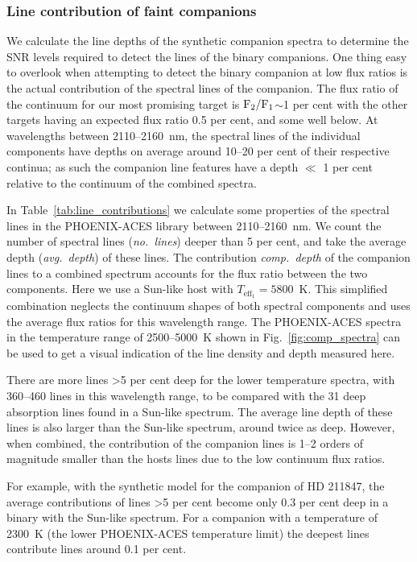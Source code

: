 \documentclass[fleqn,usenatbib]{mnras}
\newcommand*\bl{\color{blue}}
\begin{document}
    \subsubsection{Line contribution of faint companions}
    \label{subsubsec:line_contributions}
    We calculate the line depths of the synthetic companion spectra to determine the SNR levels required to detect the lines of the binary companions.
    One thing easy to overlook when attempting to detect the binary companion at low flux ratios is the actual contribution of the spectral lines of the companion.
    The flux ratio of the continuum for our most promising target is \(\rm F_2/F_1\)\(\sim\)1 per cent with the other targets having an expected flux ratio 0.5 per cent, and some well below. {\bl At wavelengths between 2110--2160~nm, the spectral lines of the individual components have depths on average around 10--20 per cent of their respective continua; as such the companion line features have a depth \(\ll\) 1 per cent relative to the continuum of the combined spectra.}
    
    In Table~\ref{tab:line_contributions} we calculate some properties of the spectral lines in the PHOENIX-ACES library between 2110--2160~nm. We count the number of spectral lines (\emph{no.\ lines}) deeper than 5 per cent, and take the average depth (\emph{avg.\ depth}) of these lines. The contribution \emph{comp.\ depth} of the companion lines to a combined spectrum accounts for the flux ratio between the two components. Here we use a Sun-like host with \(T_{\textrm{eff}_1}=5800\)~K. This simplified combination neglects the continuum shapes of both spectral components and uses the average flux ratios for this wavelength range. The PHOENIX-ACES spectra in the temperature range of 2500--5000~K shown in Fig.~\ref{fig:comp_spectra} can be used to get a visual indication of the line density and depth measured here.
    
    There are more lines >5 per cent deep for the lower temperature spectra, with 360--460 lines in this wavelength range, to be compared with the 31 deep absorption lines found in a Sun-like spectrum. The average line depth of these lines is also larger than the Sun-like spectrum, around twice as deep. However, when combined, the contribution of the companion lines is 1--2 orders of magnitude smaller than the hosts lines due to the low continuum flux ratios.
    
    For example, with the synthetic model for the companion of {HD 211847}, the average contributions of lines >5 per cent become only 0.3 per cent deep in a binary with the Sun-like spectrum. For a companion with a temperature of 2300~K (the lower PHOENIX-ACES temperature limit) the deepest lines contribute lines around 0.1 per cent.
    
\end{document}

